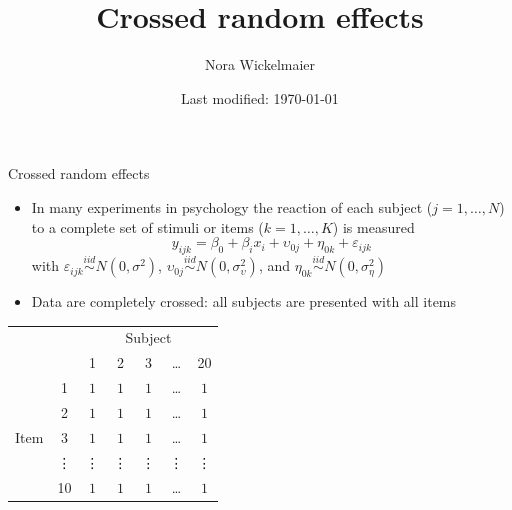 \documentclass[aspectratio=169]{beamer}
\title{Crossed random effects}
\author{Nora Wickelmaier}
\date{Last modified: \today}
\begin{document}
\begin{frame}{}
\thispagestyle{empty}
\titlepage
\end{frame}


\begin{frame}{Crossed random effects}
  \begin{itemize}
    \item In many experiments in psychology the reaction of each subject ($j =
      1, \dots, N$) to a complete set of stimuli or items ($k = 1, \dots, K$) is
      measured
  \[
    y_{ijk} = \beta_0 + \beta_ix_{i} + \upsilon_{0j} + \eta_{0k} + \varepsilon_{ijk}
  \]
  with $\varepsilon_{ijk} \overset{iid}{\sim} N(0,\sigma^2)$, 
  $\upsilon_{0j} \overset{iid}{\sim} N(0,\sigma^2_{\upsilon})$, and 
  $\eta_{0k} \overset{iid}{\sim} N(0,\sigma^2_{\eta})$

    \item Data are completely crossed: all subjects are presented with all items
  \end{itemize}
  \footnotesize
  \begin{center}
  \begin{tabular}{lcccccc}
    & & \multicolumn{5}{c}{Subject}\\
    \cline{3-7}
     & & 1 & 2 & 3 & \dots & 20 \\
    \hline
      & 1 & $1$ & $1$ & $1$ & \dots & $1$ \\
      & 2 & $1$ & $1$ & $1$ & \dots & $1$ \\
Item  & 3 & $1$ & $1$ & $1$ & \dots & $1$ \\
      & \vdots & \vdots & \vdots & \vdots & \vdots & \vdots\\
      & 10 & $1$ & $1$ & $1$ & \dots & $1$ \\
      \hline
  \end{tabular}
  \end{center}
\end{frame}
\end{document}
